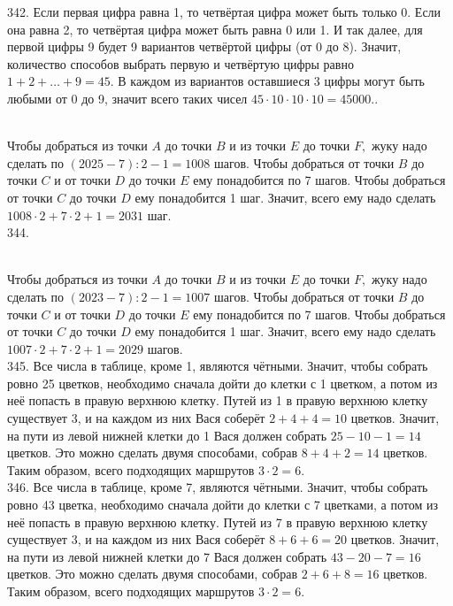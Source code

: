 342. Если первая цифра равна 1, то четвёртая цифра может быть только 0. Если она равна 2, то четвёртая цифра может быть равна 0 или 1. И так далее, для первой цифры 9 будет 9 вариантов четвёртой цифры (от 0 до 8). Значит, количество способов выбрать первую и четвёртую цифры равно $1+2+\ldots+9=45.$ В каждом из вариантов оставшиеся 3 цифры могут быть любыми от 0 до 9, значит всего таких чисел $45\cdot10\cdot10\cdot10=45000.$\newpage{}. \begin{figure}[ht!]
\end{figure}\\
Чтобы добраться из точки $A$ до точки $B$ и из точки $E$ до точки $F,$ жуку надо сделать по $(2025-7):2-1=1008$ шагов. Чтобы добраться от точки $B$ до точки $C$ и от точки $D$ до точки $E$ ему понадобится по 7 шагов. Чтобы добраться от точки $C$ до точки $D$ ему понадобится 1 шаг. Значит, всего ему надо сделать $1008\cdot2+7\cdot2+1=2031$ шаг.\\
344. \begin{figure}[ht!]
\end{figure}\\
Чтобы добраться из точки $A$ до точки $B$ и из точки $E$ до точки $F,$ жуку надо сделать по $(2023-7):2-1=1007$ шагов. Чтобы добраться от точки $B$ до точки $C$ и от точки $D$ до точки $E$ ему понадобится по 7 шагов. Чтобы добраться от точки $C$ до точки $D$ ему понадобится 1 шаг. Значит, всего ему надо сделать $1007\cdot2+7\cdot2+1=2029$ шагов.\\
345. Все числа в таблице, кроме 1, являются чётными. Значит, чтобы собрать ровно 25 цветков, необходимо сначала дойти до клетки с 1 цветком, а потом из неё попасть в правую верхнюю клетку. Путей из 1 в правую верхнюю клетку существует 3, и на каждом из них Вася соберёт $2+4+4=10$ цветков. Значит, на пути из левой нижней клетки до 1 Вася должен собрать $25-10-1=14$ цветков. Это можно сделать двумя способами, собрав $8+4+2=14$ цветков. Таким образом, всего подходящих маршрутов $3\cdot2=6.$\\
346. Все числа в таблице, кроме 7, являются чётными. Значит, чтобы собрать ровно 43 цветка, необходимо сначала дойти до клетки с 7 цветками, а потом из неё попасть в правую верхнюю клетку. Путей из 7 в правую верхнюю клетку существует 3, и на каждом из них Вася соберёт $8+6+6=20$ цветков. Значит, на пути из левой нижней клетки до 7 Вася должен собрать $43-20-7=16$ цветков. Это можно сделать двумя способами, собрав $2+6+8=16$ цветков. Таким образом, всего подходящих маршрутов $3\cdot2=6.$\\

